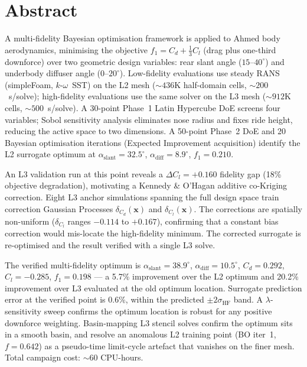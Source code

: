 \section*{Abstract}

A multi-fidelity Bayesian optimisation framework is applied to Ahmed body aerodynamics, minimising the objective $f_1 = C_d + \tfrac{1}{3}C_l$ (drag plus one-third downforce) over two geometric design variables: rear slant angle ($15$--$40^\circ$) and underbody diffuser angle ($0$--$20^\circ$). Low-fidelity evaluations use steady RANS (simpleFoam, $k$-$\omega$~SST) on the L2 mesh (${\sim}436$K half-domain cells, ${\sim}200$~s/solve); high-fidelity evaluations use the same solver on the L3 mesh (${\sim}912$K cells, ${\sim}500$~s/solve). A 30-point Phase~1 Latin Hypercube DoE screens four variables; Sobol sensitivity analysis eliminates nose radius and fixes ride height, reducing the active space to two dimensions. A 50-point Phase~2 DoE and 20 Bayesian optimisation iterations (Expected Improvement acquisition) identify the L2 surrogate optimum at $\alpha_\mathrm{slant}=32.5^\circ$, $\alpha_\mathrm{diff}=8.9^\circ$, $f_1=0.210$.

An L3 validation run at this point reveals a $\Delta C_l=+0.160$ fidelity gap (18\% objective degradation), motivating a Kennedy \& O'Hagan additive co-Kriging correction. Eight L3 anchor simulations spanning the full design space train correction Gaussian Processes $\delta_{C_d}(\mathbf{x})$ and $\delta_{C_l}(\mathbf{x})$. The corrections are spatially non-uniform ($\delta_{C_l}$ ranges $-0.114$ to $+0.167$), confirming that a constant bias correction would mis-locate the high-fidelity minimum. The corrected surrogate is re-optimised and the result verified with a single L3 solve.

The verified multi-fidelity optimum is $\alpha_\mathrm{slant}=38.9^\circ$, $\alpha_\mathrm{diff}=10.5^\circ$, $C_d=0.292$, $C_l=-0.285$, $f_1=0.198$ — a 5.7\% improvement over the L2 optimum and 20.2\% improvement over L3 evaluated at the old optimum location. Surrogate prediction error at the verified point is $0.6\%$, within the predicted $\pm2\sigma_\mathrm{HF}$ band. A $\lambda$-sensitivity sweep confirms the optimum location is robust for any positive downforce weighting. Basin-mapping L3 stencil solves confirm the optimum sits in a smooth basin, and resolve an anomalous L2 training point (BO iter~1, $f=0.642$) as a pseudo-time limit-cycle artefact that vanishes on the finer mesh. Total campaign cost: ${\sim}60$ CPU-hours.
